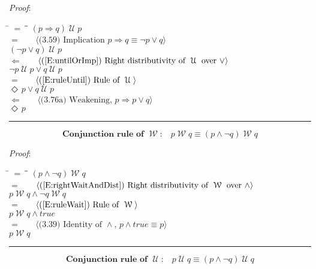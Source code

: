 \documentclass[12pt, fleqn, leqno]{article}
\newcommand{\lgap}{2pt}                             %
\newcommand{\mymathindent}{24pt}                    %
\newcommand{\impl}{\ensuremath{\Rightarrow}}        %
\newcommand{\foll}{\ensuremath{\Leftarrow}}         %
\newcommand{\Until}{\;\mathcal{U}\;}
\newcommand{\Wait}{\;\mathcal{W}\;}
\newcommand{\Event}{\Diamond\,}
\newcommand{\myqed}{\rule[-.23ex]{1.2ex}{2.0ex}}
\newcommand{\myqedtab}{\hspace{384pt}}              %
\newcommand{\Gll} {\langle}                         %
\newcommand{\Ggg} {\rangle}                         %
\newcommand{\Hint}[1]     {\ \ \ $\Gll              \mbox{#1} \Ggg$ }   %
\begin{document}
\emph{Proof}:
\begin{tabbing}
\hspace{\mymathindent} \= $= \;$ \= \myqedtab \= \kill
\> \> $(p\impl q)\Until p$\\[\lgap]
\> $=$ \> \Hint{(3.59) Implication $p\impl q\equiv \neg p\lor q$} \\[\lgap]
\> \> $(\neg p\lor q)\Until p$\\[\lgap]
\> $\foll$ \> \Hint{(\ref{E:untilOrImp}) Right distributivity of $\Until$ over $\lor$} \\[\lgap]
\> \> $\neg p \Until p\lor q\Until p$\\[\lgap]
\> $=$ \> \Hint{(\ref{E:ruleUntil}) Rule of $\Until$} \\[\lgap]
\> \> $\Event p\lor q\Until p$\\[\lgap]
\> $\foll$ \> \Hint{(3.76a) Weakening, $p\impl p\lor q$} \\[\lgap]
\> \> $\Event p$ \quad \myqed
\end{tabbing}
\begin{equation}\label{E:conRuleWait}
\textbf{Conjunction rule of $\Wait$:}\quad p\Wait q\equiv (p\land \neg q)\Wait q
\end{equation}

\emph{Proof}:
\begin{tabbing}
\hspace{\mymathindent} \= $= \;$ \= \myqedtab \= \kill
\> \> $(p\land \neg q) \Wait q$\\[\lgap]
\> $=$ \> \Hint{(\ref{E:rightWaitAndDist}) Right distributivity of $\Wait$ over $\land$} \\[\lgap]
\> \> $p\Wait q\land \neg q\Wait q$\\[\lgap]
\> $=$ \> \Hint{(\ref{E:ruleWait}) Rule of $\Wait$} \\[\lgap]
\> \> $p\Wait q\land true$\\[\lgap]
\> $=$ \> \Hint{(3.39) Identity of $\land$, $p\land true \equiv p$} \\[\lgap]
\> \> $p\Wait q$ \quad \myqed
\end{tabbing}
\begin{equation}\label{E:conRuleUntil}
\textbf{Conjunction rule of $\Until$:}\quad p\Until q\equiv (p\land \neg q)\Until q
\end{equation}
\end{document}
